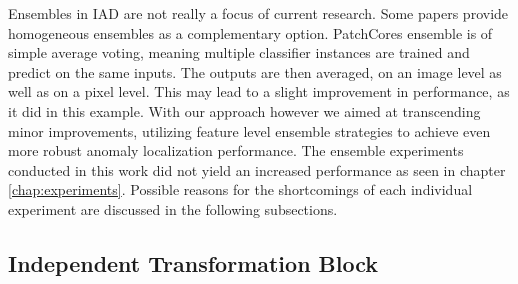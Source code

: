 Ensembles in IAD are not really a focus of current research. Some papers \cite{patchCore2022} provide homogeneous ensembles as a complementary option. 
PatchCores ensemble is of simple average voting, meaning multiple classifier instances are trained and predict on the same inputs. The outputs are then averaged, on an image level as well as on a pixel level. 
This may lead to a slight improvement in performance, as it did in this example. 
With our approach however we aimed at transcending minor improvements, utilizing feature level ensemble strategies to achieve even more robust anomaly localization performance.
The ensemble experiments conducted in this work did not yield an increased performance as seen in chapter \ref{chap:experiments}. 
Possible reasons for the shortcomings of each individual experiment are discussed in the following subsections.

\subsection{Independent Transformation Block}
\label{subsec:ITBfaildiscussion}

